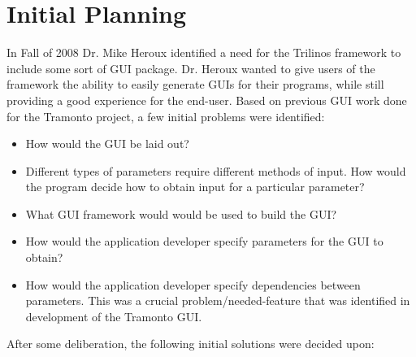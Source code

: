 \section{Initial Planning}
In Fall of 2008 Dr. Mike Heroux identified a need for
the Trilinos framework to include some sort of GUI package. Dr. Heroux wanted 
to give users of the framework the ability to easily generate GUIs for their
programs, while still providing a good experience for the end-user. Based on
previous GUI work done for the Tramonto project, a few initial problems were
identified:

	\begin{itemize}
		\item How would the GUI be laid out?
		\item Different types of parameters require different methods of input.
			How would the program decide how to obtain input for a particular
			parameter?
		\item What GUI framework would would be used to build the GUI?
		\item How would the application developer specify parameters for the
			GUI to obtain?
		\item How would the application developer specify dependencies between
		parameters. This was a crucial problem/needed-feature that was identified in
		development of the Tramonto GUI.
	\end{itemize}

After some deliberation, the following initial solutions were decided upon:

